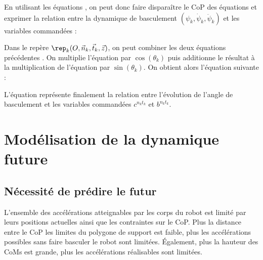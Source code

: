 				En utilisant les équations  , on peut donc faire disparaître le CoP des équations  et exprimer la relation entre la dynamique de basculement $(\psi_k, \dot{\psi}_k, \ddot{\psi}_k)$ et les variables commandées :
				
				Dans le repère $\rep_k(O, \vec{n}_k, \vec{t}_k, \vec{z})$, on peut combiner les deux équations précédentes .
				On multiplie l'équation  par $\cos(\theta_k)$ puis additionne le résultat à la multiplication de l'équation  par $\sin(\theta_k)$.
				On obtient alors l'équation suivante :
				
				L'équation  représente finalement la relation entre l'évolution de l'angle de basculement et les variables commandées  $c^{n_kt_k}$ et $b^{n_kt_k}$.

	\section{Modélisation de la dynamique future}
		\label{section.modele_futur}
		\subsection{Nécessité de prédire le futur}
	
			L'ensemble des accélérations atteignables par les corps du robot est limité par leurs positions actuelles ainsi que les contraintes sur le CoP. 
			Plus la distance entre le CoP les limites du polygone de support est faible, plus les accélérations possibles sans faire basculer le robot sont limitées.
			Également, plus la hauteur des CoMs est grande, plus les accélérations réalisables sont limitées.
			
